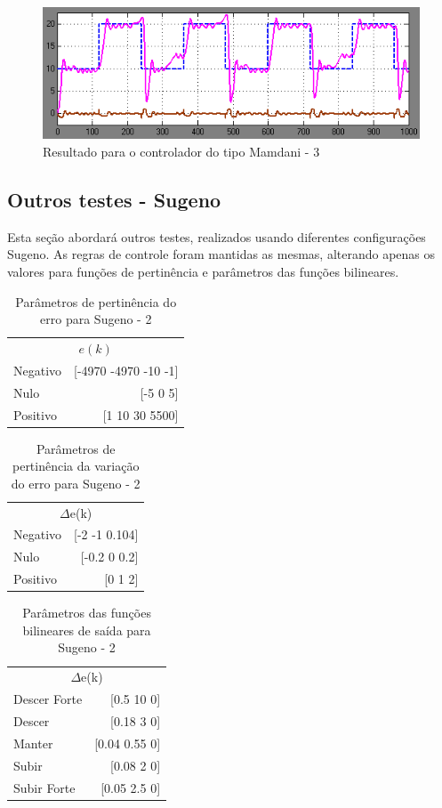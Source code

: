\documentclass[conference]{IEEEtran}
\begin{document}
\begin{figure}[!h]
    \centering
    \includegraphics[scale=0.2]{mamdani3.png}
    \caption { Resultado para o controlador do tipo Mamdani - 3}
\end{figure}

\subsection{Outros testes - Sugeno}

Esta seção abordará outros testes, realizados usando diferentes configurações Sugeno. As regras de controle foram mantidas as mesmas, alterando apenas os valores para funções de pertinência e parâmetros das funções bilineares.

\begin{table}[!h]
\caption{Parâmetros de pertinência do erro para Sugeno - 2}
\centering
\begin{tabular}{lr}
\toprule
\multicolumn{2}{c}{$e(k)$} \\
\cmidrule(r){1-2}
Negativo & [-4970 -4970 -10 -1] \\
Nulo & [-5 0 5] \\
Positivo & [1 10 30 5500] \\
\bottomrule
\end{tabular}
\end{table}

\begin{table}[!h]
\caption{Parâmetros de pertinência da variação do erro para Sugeno - 2}
\centering
\begin{tabular}{lr}
\toprule
\multicolumn{2}{c}{$\Delta$e(k)} \\
\cmidrule(r){1-2}
Negativo & [-2 -1 0.104] \\
Nulo & [-0.2 0 0.2] \\
Positivo & [0 1 2] \\
\bottomrule
\end{tabular}
\end{table}

\begin{table}[!h]
\caption{Parâmetros das funções bilineares de saída para Sugeno - 2}
\centering
\begin{tabular}{lr}
\toprule
\multicolumn{2}{c}{$\Delta$e(k)} \\
\cmidrule(r){1-2}
Descer Forte & [0.5 10 0] \\
Descer & [0.18 3 0] \\
Manter & [0.04 0.55 0] \\
Subir & [0.08 2 0] \\
Subir Forte & [0.05 2.5 0] \\
\bottomrule
\end{tabular}
\end{table}
\end{document}

